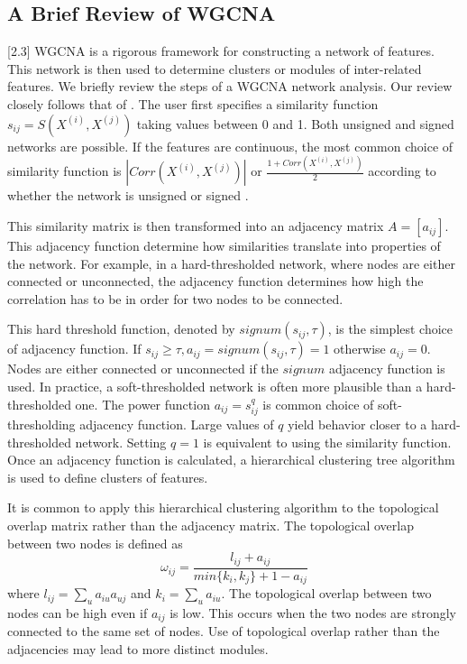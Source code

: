\documentclass[article,shortnames]{jss}
\begin{document}
\subsection{A Brief Review of WGCNA}[2.3]
WGCNA is a rigorous framework for constructing a network of features. 
This network is then used to determine clusters or modules of inter-related features. 
We briefly review the steps of a WGCNA network analysis.  Our review closely follows that of \cite{zhang2005general}.  
The user first specifies a similarity function $s_{ij}=S(X^{(i)},X^{(j)})$ taking values between 0 and 1.  Both unsigned and signed 
networks are possible.  If the features are continuous, the most common choice of similarity function is $|Corr(X^{(i)},X^{(j)})|$ or 
$\frac{1 + Corr(X^{(i)},X^{(j)})}{2}$  according to whether the network is unsigned or signed \citep{zhang2005general}.

This similarity matrix is then transformed into an adjacency matrix $A=[a_{ij}]$.  This adjacency function determine how similarities translate
into properties of the network.  For example, in a hard-thresholded network, where nodes are either connected or unconnected,
the adjacency function determines how high the correlation has to be in order for two nodes to be connected.

This hard threshold function, denoted by $signum(s_{ij},\tau)$,  is the simplest choice of adjacency function.   
If $s_{ij} \geq \tau, a_{ij}=signum(s_{ij},\tau)=1$ otherwise $a_{ij}=0$.  Nodes are either connected or 
unconnected if the $signum$ adjacency function is used.  In practice, a soft-thresholded network is often more plausible than a 
hard-thresholded one.  The power function $a_{ij}=s_{ij}^{q}$ is common choice of soft-thresholding adjacency function.  Large values
of $q$ yield behavior closer to a hard-thresholded network.  Setting $q=1$ is equivalent to using the similarity function.
Once an adjacency function is calculated, a hierarchical clustering tree algorithm 
is used to define clusters of features.

It is common to apply this hierarchical clustering algorithm to the topological overlap matrix rather than the adjacency matrix.  The topological
overlap between two nodes is defined as 
\begin{equation}
\omega_{ij} = \frac{l_{ij} + a_{ij}}{min\{k_{i},k_{j}\} + 1 - a_{ij}}
\end{equation} 
where $l_{ij}=\sum_{u}a_{iu}a_{uj}$ and $k_{i}=\sum_{u}a_{iu}$\citep{horvath2011weighted}.  The topological overlap between two nodes can be high even if $a_{ij}$ is low.
This occurs when the two nodes are strongly connected to the same set of nodes.  Use of topological overlap rather
than the adjacencies may lead to more distinct modules\citep{zhang2005general}.
\end{document}
